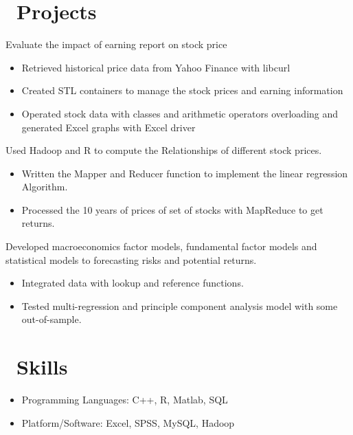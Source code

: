 \documentclass{resume}
\begin{document}
\section{\faCogs\ Projects}
Evaluate the impact of earning report on stock price
\begin{itemize}
  \item Retrieved historical price data from Yahoo Finance with libcurl
  \item Created STL containers to manage the stock prices and earning information
  \item Operated stock data with classes and arithmetic operators overloading and generated Excel graphs with Excel driver
\end{itemize}

Used Hadoop and R to compute the Relationships of different stock prices.
\begin{itemize}
  \item Written the Mapper and Reducer function to implement the linear regression Algorithm.
  \item Processed the 10 years of prices of set of stocks with MapReduce to get returns.
\end{itemize}

Developed macroeconomics factor models, fundamental factor models and statistical models to forecasting risks and potential returns.
\begin{itemize}
  \item Integrated data with lookup and reference functions.
  \item Tested multi-regression and principle component analysis model with some out-of-sample.
\end{itemize}

\section{\faCog\ Skills}
\begin{itemize}[parsep=0.5ex]
  \item Programming Languages: C++, R, Matlab, SQL
  \item Platform/Software: Excel, SPSS, MySQL, Hadoop
\end{itemize}

\end{document}
